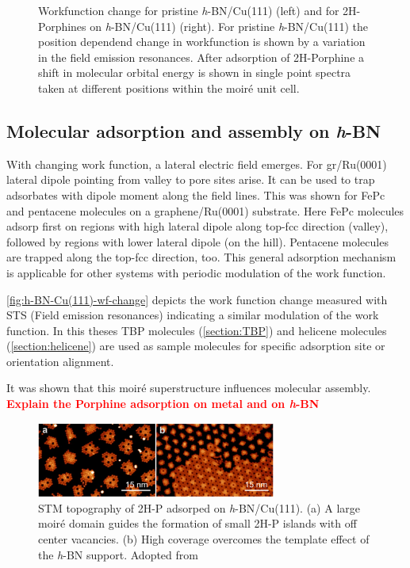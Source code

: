 \begin{figure}
{	\label{fig:h-BN-Cu(111)-wf-change-II}
	}
	\caption{Workfunction change for pristine \textit{h}-BN/Cu(111) (left) and for 2H-Porphines on \textit{h}-BN/Cu(111) (right). For pristine \textit{h}-BN/Cu(111) the position dependend change in workfunction is shown by a variation in the field emission resonances. After adsorption of 2H-Porphine a shift in molecular orbital energy is shown in single point spectra taken at different positions within the moir\'e unit cell.}
	\label{fig:h-BN-Cu(111)-wf-change}
\end{figure}

\subsection{Molecular adsorption and assembly on \textit{h}-BN}
\label{section:Mol-on-h-BN}
With changing work function, a lateral electric field emerges. For gr/Ru(0001) lateral dipole pointing from valley to pore sites arise.\cite{zhang_assembly_2011} It can be used to trap adsorbates with dipole moment along the field lines. This was shown for FePc and pentacene molecules on a graphene/Ru(0001) substrate. Here FePc molecules adsorp first on regions with high lateral dipole along top-fcc direction (valley), followed by regions with lower lateral dipole (on the hill). Pentacene molecules are trapped along the top-fcc direction, too.\cite{zhang_assembly_2011}  This general adsorption mechanism is applicable for other systems with periodic modulation of the work function.

\autoref{fig:h-BN-Cu(111)-wf-change} depicts the work function change measured with STS (Field emission resonances) indicating a similar modulation of the work function. In this theses TBP molecules (\autoref{section:TBP}) and helicene molecules (\autoref{section:helicene}) are used as sample molecules for specific adsorption site or orientation alignment.

It was shown that this moir\'e superstructure influences molecular assembly. 
\textcolor{red}{\textbf{Explain the Porphine adsorption on metal and on \textit{h}-BN}}

\begin{figure} \centering
	\includegraphics[width=0.7\textwidth]{./images/2H-P-hBN-Cu111-joshi}%
	\caption{STM topography of 2H-P adsorped on \textit{h}-BN/Cu(111). (a) A large moir\'e domain guides the formation of small 2H-P islands with off center vacancies. (b) High coverage overcomes the template effect of the \textit{h}-BN support. Adopted from \cite{diss-joshi}}
	\label{fig:2H-P-hBN-Cu111-joshi}
\end{figure}

